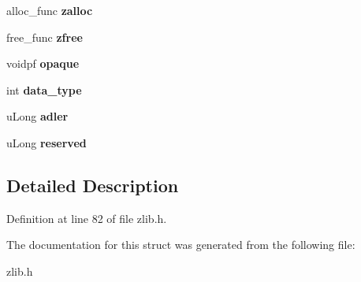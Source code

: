 \begin{DoxyCompactItemize}
\item 
\hypertarget{structz__stream__s_a23a2299c384f808e76e9908f21216b0f}{alloc\+\_\+func {\bfseries zalloc}}\label{structz__stream__s_a23a2299c384f808e76e9908f21216b0f}

\item 
\hypertarget{structz__stream__s_a89eb750ade7f4f0b56bfdadf13344982}{free\+\_\+func {\bfseries zfree}}\label{structz__stream__s_a89eb750ade7f4f0b56bfdadf13344982}

\item 
\hypertarget{structz__stream__s_ab72467f908d2ce65d5b42ee6556ef8bb}{voidpf {\bfseries opaque}}\label{structz__stream__s_ab72467f908d2ce65d5b42ee6556ef8bb}

\item 
\hypertarget{structz__stream__s_a9d8f63877d7639a8bca60f9fc3704fc4}{int {\bfseries data\+\_\+type}}\label{structz__stream__s_a9d8f63877d7639a8bca60f9fc3704fc4}

\item 
\hypertarget{structz__stream__s_ade2217fe31e671be1257731883201223}{u\+Long {\bfseries adler}}\label{structz__stream__s_ade2217fe31e671be1257731883201223}

\item 
\hypertarget{structz__stream__s_add73791dd19b49c9c68f3f3d328c37db}{u\+Long {\bfseries reserved}}\label{structz__stream__s_add73791dd19b49c9c68f3f3d328c37db}

\end{DoxyCompactItemize}


\subsection{Detailed Description}


Definition at line 82 of file zlib.\+h.



The documentation for this struct was generated from the following file\+:\begin{DoxyCompactItemize}
\item 
zlib.\+h\end{DoxyCompactItemize}
